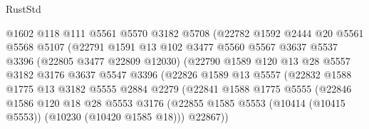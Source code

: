 \begin{lexlean}{RustStd}
\begin{coremodule}
                          @1602
                          @118
                          @111
                          @5561
                          @5570
                          @3182
                          @5708
                          (@22782
                            @1592
                            @2444
                            @20
                            @5561
                            @5568
                            @5107
                            (@22791
                              @1591
                              @13
                              @102
                              @3477
                              @5560
                              @5567
                              @3637
                              @5537
                              @3396
                              (@22805 @3477 @22809 @12030)
                              (@22790
                                @1589
                                @120
                                @13
                                @28
                                @5557
                                @3182
                                @3176
                                @3637
                                @5547
                                @3396
                                (@22826
                                  @1589
                                  @13
                                  @5557
                                  (@22832
                                    @1588
                                    @1775
                                    @13
                                    @3182
                                    @5555
                                    @2884
                                    @2279
                                    (@22841
                                      @1588
                                      @1775
                                      @5555
                                      (@22846
                                        @1586
                                        @120
                                        @18
                                        @28
                                        @5553
                                        @3176
                                        (@22855
                                          @1585
                                          @5553
                                          (@10414 (@10415 @5553))
                                          (@10230 (@10420 @1585 @18)))
                                        @22867))

\end{coremodule}
\end{lexlean}
